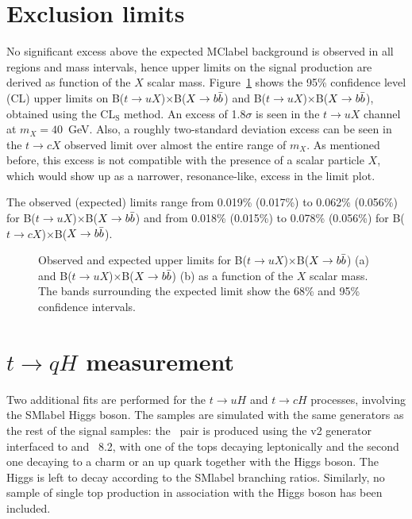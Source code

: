 \clearpage

\section{Exclusion limits}

No significant excess above the expected \acrshort{MClabel} background is observed in all regions and mass intervals, hence upper limits on the signal production are derived as function of the $X$ scalar mass. Figure~\ref{tqX:xseclimits} shows the 95\% confidence level (CL) upper limits on B($t\to uX$)$\times$B($X\to b\bar{b}$) and B($t\to uX$)$\times$B($X\to b\bar{b}$), obtained using the CL$_\text{S}$ method. An excess of 1.8$\sigma$ is seen in the $t\to uX$ channel at $m_X=40$~GeV. Also, a roughly two-standard deviation excess can be seen in the $t\to cX$ observed limit over almost the entire range of $m_X$. As mentioned before, this excess is not compatible with the presence of a scalar particle $X$, which would show up as a narrower, resonance-like, excess in the limit plot.

The observed (expected) limits range from 0.019\% (0.017\%) to 0.062\% (0.056\%) for B($t\to uX$)$\times$B($X\to b\bar{b}$) and from 0.018\% (0.015\%) to 0.078\% (0.056\%) for B($t\to cX$)$\times$B($X\to b\bar{b}$).

\begin{figure}[htb]
    \RawFloats
    \centering
    \caption{Observed and expected upper limits for B($t\to uX$)$\times$B($X\to b\bar{b}$) (a) and B($t\to uX$)$\times$B($X\to b\bar{b}$) (b) as a function of the $X$ scalar mass. The bands surrounding the expected limit show the 68\% and 95\% confidence intervals.}
    \label{tqX:xseclimits}
\end{figure}

\section{$t\to qH$ measurement}

Two additional fits are performed for the $t\to uH$ and $t\to cH$ processes, involving the \acrshort{SMlabel} Higgs boson. The samples are simulated with the same generators as the rest of the signal samples: the \ttbar\ pair is produced using the \POWHEGBOX v2 generator interfaced to \MADSPIN and \PYTHIA~8.2, with one of the tops decaying leptonically and the second one decaying to a charm or an up quark together with the Higgs boson. The Higgs is left to decay according to the \acrshort{SMlabel} branching ratios. Similarly, no sample of single top production in association with the Higgs boson has been included.

